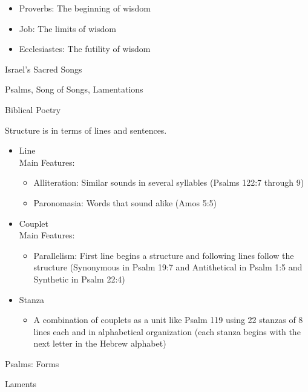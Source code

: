 \documentclass{article}
\begin{document}
    \begin{itemize}
        \item Proverbs: The beginning of wisdom
        \item Job: The limits of wisdom
        \item Ecclesiastes: The futility of wisdom
    \end{itemize}

    \centerline{Israel's Sacred Songs}

    Psalms, Song of Songs, Lamentations

    \centerline{Biblical Poetry}

    Structure is in terms of lines and sentences.

    \begin{itemize}
        \item Line \\
            Main Features: \\
                \begin{itemize}
                    \item Alliteration: Similar sounds in several syllables (Psalms 122:7 through 9)
                    \item Paronomasia: Words that sound alike (Amos 5:5)
                \end{itemize}
        \item Couplet \\
            Main Features: \\
                \begin{itemize}
                    \item Parallelism: First line begins a structure and following lines follow the structure (Synonymous in Psalm 19:7 and Antithetical in Psalm 1:5 and Synthetic in Psalm 22:4)
                \end{itemize}
        \item Stanza \\
            \begin{itemize}
                \item A combination of couplets as a unit like Psalm 119 using 22 stanzas of 8 lines each and in alphabetical organization (each stanza begins with the next letter in the Hebrew alphabet)
            \end{itemize}
    \end{itemize}

    \centerline{Psalms: Forms}
    
    Laments
\end{document}

